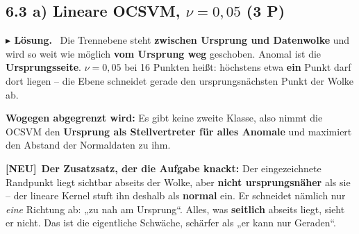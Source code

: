 \documentclass[10pt,a4paper]{article}
\newcommand{\pkt}[1]{\hfill\textbf{(#1 P)}}
\newcommand{\neu}{{\color{neurot}\footnotesize\bfseries[NEU]}\ }
\newenvironment{loes}%
  {\par\vspace{2pt}\begingroup\small\noindent\textbf{\color{loesfarbe}$\blacktriangleright$ Lösung.}\ }%
  {\endgroup\par\vspace{5pt}}
\begin{document}
\subsection*{6.3 a) Lineare OCSVM, $\nu = 0{,}05$ \pkt{3}}

\begin{center}
\end{center}

\begin{loes}
Die Trennebene steht \textbf{zwischen Ursprung und Datenwolke} und wird so weit wie möglich
\textbf{vom Ursprung weg} geschoben. Anomal ist die \textbf{Ursprungsseite}.
$\nu = 0{,}05$ bei 16 Punkten heißt: höchstens etwa \textbf{ein} Punkt darf dort liegen -- die
Ebene schneidet gerade den ursprungsnächsten Punkt der Wolke ab.

\textbf{Wogegen abgegrenzt wird:} Es gibt keine zweite Klasse, also nimmt die OCSVM den
\textbf{Ursprung als Stellvertreter für alles Anomale} und maximiert den Abstand der Normaldaten
zu ihm.

\neu \textbf{Der Zusatzsatz, der die Aufgabe knackt:} Der eingezeichnete Randpunkt liegt sichtbar
abseits der Wolke, aber \textbf{nicht ursprungsnäher} als sie -- der lineare Kernel stuft ihn
deshalb als \textbf{normal} ein. Er schneidet nämlich nur \emph{eine} Richtung ab: „zu nah am
Ursprung``. Alles, was \textbf{seitlich} abseits liegt, sieht er nicht. Das ist die eigentliche
Schwäche, schärfer als „er kann nur Geraden``.
\end{loes}
\end{document}
